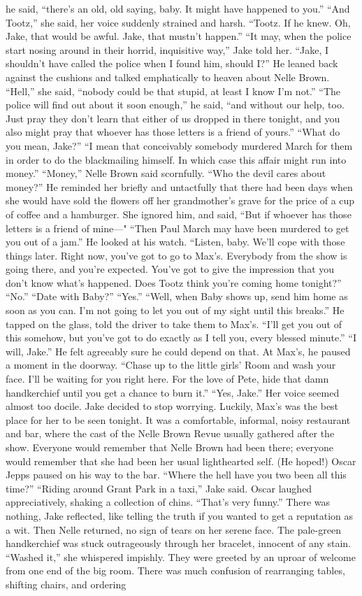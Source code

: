 \documentclass{novel}
\begin{document}
he said, “there’s an old, old saying, baby. It might have happened to you.” “And Tootz,” she said, her voice suddenly strained and harsh. “Tootz. If he knew. Oh, Jake, that would be awful. Jake, that mustn’t happen.” “It may, when the police start nosing around in their horrid, inquisitive way,” Jake told her. “Jake, I shouldn’t have called the police when I found him, should I?” He leaned back against the cushions and talked emphatically to heaven about Nelle Brown. “Hell,” she said, “nobody could be that stupid, at least I know I’m not.” “The police will find out about it soon enough,” he said, “and without our help, too. Just pray they don’t learn that either of us dropped in there tonight, and you also might pray that whoever has those letters is a friend of yours.” “What do you mean, Jake?” “I mean that conceivably somebody murdered March for them in order to do the blackmailing himself. In which case this affair might run into money.” “Money,” Nelle Brown said scornfully. “Who the devil cares about money?” He reminded her briefly and untactfully that there had been days when she would have sold the flowers off her grandmother’s grave for the price of a cup of coffee and a hamburger. She ignored him, and said, “But if whoever has those letters is a friend of mine—" “Then Paul March may have been murdered to get you out of a jam.” He looked at his watch. “Listen, baby. We’ll cope with those things later. Right now, you’ve got to go to Max’s. Everybody from the show is going there, and you’re expected. You’ve got to give the impression that you don’t know what’s happened. Does Tootz think you’re coming home tonight?” “No.” “Date with Baby?” “Yes.” “Well, when Baby shows up, send him home as soon as you can. I’m not going to let you out of my sight until this breaks.” He tapped on the glass, told the driver to take them to Max’s. “I’ll get you out of this somehow, but you’ve got to do exactly as I tell you, every blessed minute.” “I will, Jake.” He felt agreeably sure he could depend on that. At Max’s, he paused a moment in the doorway. “Chase up to the little girls’ Room and wash your face. I’ll be waiting for you right here. For the love of Pete, hide that damn handkerchief until you get a chance to burn it.” “Yes, Jake.” Her voice seemed almost too docile. Jake decided to stop worrying. Luckily, Max’s was the best place for her to be seen tonight. It was a comfortable, informal, noisy restaurant and bar, where the cast of the Nelle Brown Revue usually gathered after the show. Everyone would remember that Nelle Brown had been there; everyone would remember that she had been her usual lighthearted self. (He hoped!) Oscar Jepps paused on his way to the bar. “Where the hell have you two been all this time?” “Riding around Grant Park in a taxi,” Jake said. Oscar laughed appreciatively, shaking a collection of chins. “That’s very funny.” There was nothing, Jake reflected, like telling the truth if you wanted to get a reputation as a wit. Then Nelle returned, no sign of tears on her serene face. The pale-green handkerchief was stuck outrageously through her bracelet, innocent of any stain. “Washed it,” she whispered impishly. They were greeted by an uproar of welcome from one end of the big room. There was much confusion of rearranging tables, shifting chairs, and ordering 
\end{document}
